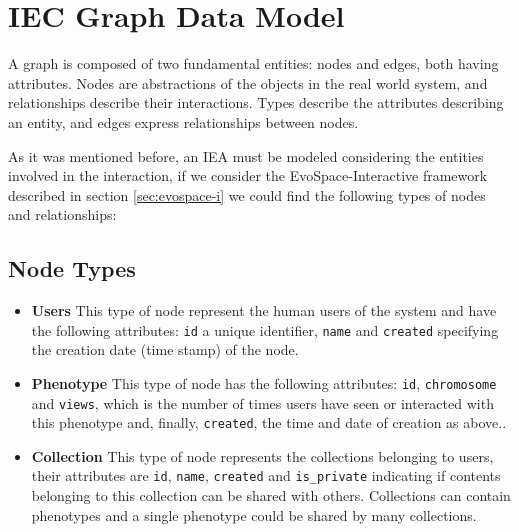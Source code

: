 \documentclass[conference]{IEEEtran}
\begin{document}
\section{IEC Graph Data Model} 

A graph is composed of two fundamental entities: nodes and edges,
both having attributes. Nodes are abstractions of the objects in the real 
world system, and relationships describe their interactions. Types describe
the attributes describing an entity, and edges express relationships
between nodes. 

As it was mentioned before, an IEA must be modeled considering the 
entities involved in the interaction, if we consider the EvoSpace-Interactive framework
described in section  \ref{sec:evospace-i} we could find the following types of
nodes and relationships:



\subsection{Node Types}
\begin{itemize}

\item {\bf Users} This type of node represent the human users of the system and have 
the following attributes: {\tt id} a unique identifier, {\tt name}  and {\tt created}
specifying the  creation date (time stamp) of the node. 

\item {\bf Phenotype} This type of node has the following attributes: 
{\tt id}, {\tt chromosome}  and {\tt views}, which is the number of
times users have seen or interacted with this phenotype and, finally, 
 {\tt created}, the time and date of creation as above..

\item {\bf Collection} This type of node represents the collections belonging
to users, their attributes are {\tt id}, 
{\tt name}, {\tt created} and {\tt is\_private} indicating if contents
belonging to this collection can be shared with others. Collections can contain
phenotypes and a single phenotype could be shared by many
collections. %
\end{itemize}
\end{document}
